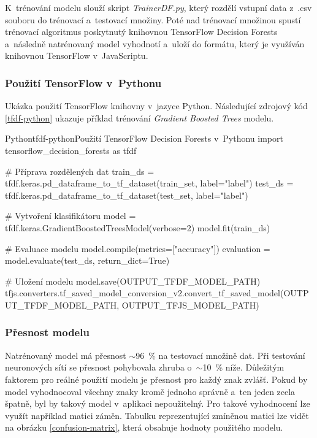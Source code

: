 \documentclass[
  master,
  program=ainfvs,
  biblatex,
  figures=true,
  tables=false,
  sourcecodes=true,
  glossaries,
  index
]{kidiplom}
\begin{document}
        K~trénování modelu slouží skript \emph{TrainerDF.py}, který rozdělí vstupní data z~.csv souboru do trénovací a~testovací množiny. Poté nad trénovací množinou spustí trénovací algoritmus poskytnutý knihovnou TensorFlow Decision Forests a~následně natrénovaný model vyhodnotí a~uloží do formátu, který je využíván knihovnou TensorFlow v~JavaScriptu.


        \subsubsection{Použití TensorFlow v~Pythonu}
            Ukázka použití TensorFlow knihovny v~jazyce Python. Následující zdrojový kód \ref{tfdf-python} ukazuje příklad trénování \emph{Gradient Boosted Trees} modelu. 
                 
                 \begin{kicode}{Python}{tfdf-python}{Použití TensorFlow Decision Forests v~Pythonu}
import tensorflow_decision_forests as tfdf

# Příprava rozdělených dat
train_ds = tfdf.keras.pd_dataframe_to_tf_dataset(train_set, label="label")
test_ds = tfdf.keras.pd_dataframe_to_tf_dataset(test_set, label="label")

# Vytvoření klasifikátoru
model = tfdf.keras.GradientBoostedTreesModel(verbose=2)
model.fit(train_ds)

# Evaluace modelu
model.compile(metrics=["accuracy"])
evaluation = model.evaluate(test_ds, return_dict=True)

# Uložení modelu
model.save(OUTPUT_TFDF_MODEL_PATH)
tfjs.converters.tf_saved_model_conversion_v2.convert_tf_saved_model(OUTPUT_TFDF_MODEL_PATH, OUTPUT_TFJS_MODEL_PATH)
                \end{kicode}


        \subsubsection{Přesnost modelu}
            Natrénovaný model má přesnost \(\sim \)96~\% na testovací množině dat. Při testování neuronových sítí se přesnost pohybovala zhruba o~\(\sim \)10~\% níže. Důležitým faktorem pro reálné použití modelu je přesnost pro každý znak zvlášť. Pokud by model vyhodnocoval všechny znaky kromě jednoho správně a~ten jeden zcela špatně, byl by takový model v~aplikaci nepoužitelný. Pro takové vyhodnocení lze využít například matici záměn. Tabulku reprezentující zmíněnou matici lze vidět na obrázku \ref{confusion-matrix}, která obsahuje hodnoty použitého modelu.
\end{document}
